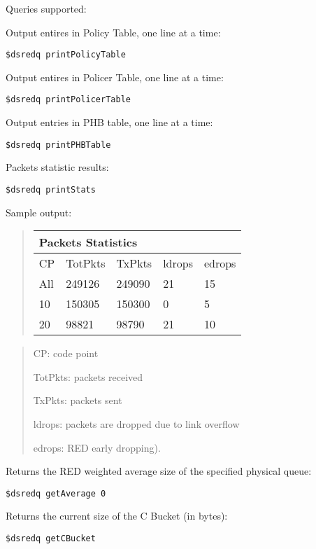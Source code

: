Queries supported:
\begin{description}
\item
Output entires in Policy Table, one line at a time:

{\tt \$dsredq printPolicyTable}

\item
Output entires in Policer Table, one line at a time:

{\tt \$dsredq printPolicerTable}

\item
Output entries in PHB table, one line at a time:

{\tt \$dsredq printPHBTable}

\item
Packets statistic results:

{\tt \$dsredq printStats}

Sample output:

\begin{quote}
\begin{tabular}{lllll}
\multicolumn{5}{l}{Packets Statistics}  \\
\hline\hline
 CP & TotPkts & TxPkts & ldrops & edrops \\
\hline
All & 249126 & 249090 &    21 &      15  \\
 10 & 150305 & 150300 &     0 &       5  \\
 20 & 98821  &  98790 &    21 &      10  \\
\end{tabular}
\end{quote}

\begin{quote}
CP: code point

TotPkts: packets received

TxPkts: packets sent

ldrops: packets are dropped due to link overflow
	               
edrops: RED early dropping).
\end{quote}

\item
Returns the RED weighted average size of the specified physical queue:

{\tt \$dsredq getAverage 0}

\item
Returns the current size of the C Bucket (in bytes):

{\tt \$dsredq getCBucket}

\end{description}

